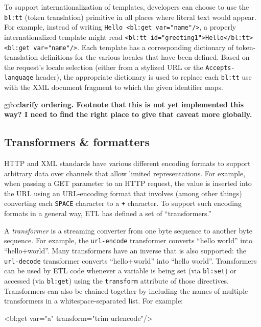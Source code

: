\documentclass{www2003-submission}
\newcommand{\smtexttt}[1]{{\small\texttt{#1}}}
\newcommand{\gjb}[1]{{\sc gjb:}\textbf{#1}}
\newenvironment{smallverbatim}%
{\renewcommand{\baselinestretch}{1}\small\verbatim}%
{\renewcommand{\baselinestretch}{2}\endverbatim}
\begin{document}
To support internationalization of templates, developers can choose to
use the \smtexttt{bl:tt} (token translation) primitive in all places
where literal text would appear.  For example, instead of writing
\smtexttt{Hello <bl:get var="name"/>}, a properly internationalized
template might read \smtexttt{<bl:tt id="greeting1">Hello</bl:tt>
<bl:get var="name"/>}. Each template has a corresponding dictionary of
token-translation definitions for the various locales that have been
defined.  Based on the request's locale selection (either from a
stylized URL or the \smtexttt{Accepts-language} header), the
appropriate dictionary is used to replace each \smtexttt{bl:tt} use
with the XML document fragment to which the given identifier maps.

\gjb{clarify ordering.  Footnote that this is not yet
implemented this way?  I need to find the right place to give that
caveat more globally.}

\subsection{Transformers \& formatters}
\label{ssec-transformers}

HTTP and XML standards have various different encoding formats to
support arbitrary data over channels that allow limited
representations.  For example, when passing a GET parameter to an HTTP
request, the value is inserted into the URL using an URL-encoding
format that involves (among other things) converting each
\smtexttt{SPACE} character to a \smtexttt{+} character.  To support
such encoding formats in a general way, ETL has defined a set of
``transformers.''

A \emph{transformer} is a streaming converter from one byte sequence to
another byte sequence.  For example, the \smtexttt{url-encode}
transformer converts ``hello world'' into ``hello+world''.  Many
transformers have an inverse that is also supported: the
\smtexttt{url-decode} transformer converts ``hello+world'' into ``hello
world''.  Transformers can be used by ETL code whenever a variable is
being set (via \smtexttt{bl:set}) or accessed (via \smtexttt{bl:get})
using the \smtexttt{transform} attribute of those directives.
Transformers can also be chained together by including the names of
multiple transformers in a whitespace-separated list.  For example:

\begin{smallverbatim}
<bl:get var="a" transform="trim urlencode"/>
\end{smallverbatim}
\end{document}
